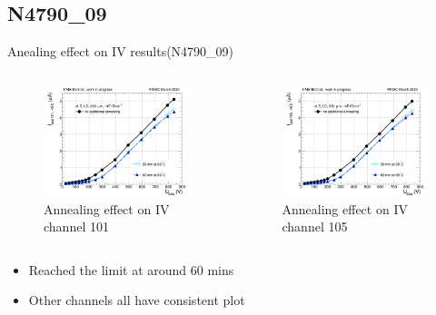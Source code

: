 \documentclass{beamer}
\begin{document}
\subsection{N4790\_09}

\begin{frame}{Anealing effect on IV results(N4790\_09) }
  \begin{columns}
       \begin{figure}
           \includegraphics[width=1.0\textwidth]{plots/8in_198ch_2019_N4790_09_4E15_neg40degC_annealing_IV_ch101.png}
           \caption{Annealing effect on IV channel 101 }
       \end{figure}
       \begin{figure}
           \includegraphics[width=1.0\textwidth]{plots/8in_198ch_2019_N4790_09_4E15_neg40degC_annealing_IV_ch105.png}
           \caption{Annealing effect on IV channel 105}
       \end{figure}
   \end{columns}
   \begin{itemize}
      \item Reached the limit at around 60 mins
      \item Other channels all have consistent plot
   \end{itemize}
\end{frame}
\end{document}
